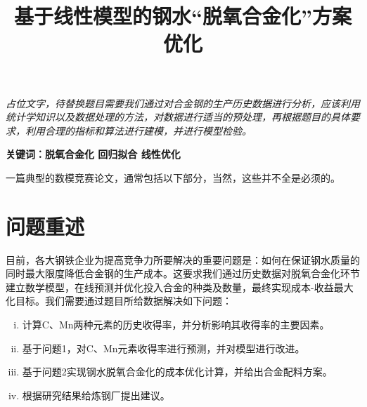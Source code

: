 \documentclass{xcumcmart}
\title{基于线性模型的钢水“脱氧合金化”方案优化}
\begin{document}
\renewcommand\arraystretch{2}



\maketitle
\begin{cnabstract}%
\setlength{\parskip}{1.4em}

\par \textit{占位文字，待替换题目需要我们通过对合金钢的生产历史数据进行分析，应该利用统计学知识以及数据处理的方法，对数据进行适当的预处理，再根据题目的具体要求，利用合理的指标和算法进行建模，并进行模型检验。}
\par \textbf{关键词：脱氧合金化 回归拟合 线性优化}
\end{cnabstract}
\setlength{\parskip}{1.4em}

一篇典型的数模竞赛论文，通常包括以下部分，当然，这些并不全是必须的。
\section{问题重述}
\par 目前，各大钢铁企业为提高竞争力所要解决的重要问题是：如何在保证钢水质量的同时最大限度降低合金钢的生产成本。这要求我们通过历史数据对脱氧合金化环节建立数学模型，在线预测并优化投入合金的种类及数量，最终实现成本-收益最大化目标。我们需要通过题目所给数据解决如下问题：
\begin{enumerate}[(i)]%
\item 计算C、Mn两种元素的历史收得率，并分析影响其收得率的主要因素。
\item 基于问题1，对C、Mn元素收得率进行预测，并对模型进行改进。
\item 基于问题2实现钢水脱氧合金化的成本优化计算，并给出合金配料方案。
\item 根据研究结果给炼钢厂提出建议。
\end{enumerate}
\end{document}
